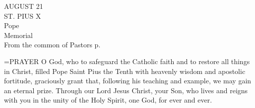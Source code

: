 \begin{center}\normalsize AUGUST 21\\
\footnotesize ST. PIUS X\\
\footnotesize Pope\\
\footnotesize Memorial\\
\footnotesize From the common of Pastors p. \\
\end{center}

\hangindent=\parindent \small{PRAYER 
O God, who to safeguard the Catholic faith
and to restore all things in Christ,
filled Pope Saint Pius the Tenth
with heavenly wisdom and apostolic fortitude,
graciously grant
that, following his teaching and example,
we may gain an eternal prize.
Through our Lord Jesus Christ, your Son,
who lives and reigns with you in the unity of the Holy Spirit,
one God, for ever and ever.\\}
 
